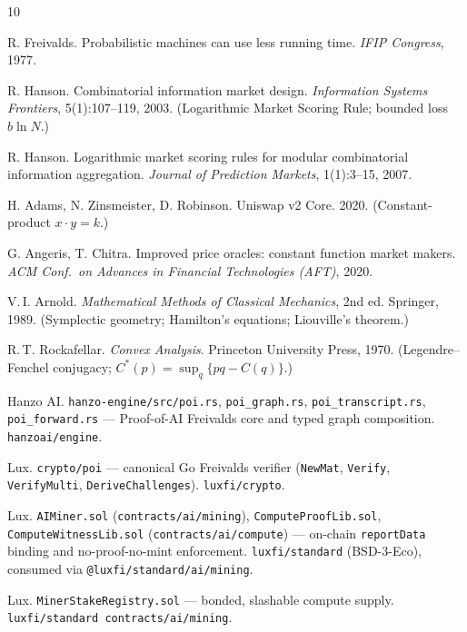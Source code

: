 \documentclass[11pt]{article}
\newcommand{\code}[1]{\texttt{#1}}
\begin{document}
\begin{thebibliography}{10}

R. Freivalds. Probabilistic machines can use less running time.
\textit{IFIP Congress}, 1977.

R. Hanson. Combinatorial information market design.
\textit{Information Systems Frontiers}, 5(1):107--119, 2003.
(Logarithmic Market Scoring Rule; bounded loss $b\ln N$.)

R. Hanson. Logarithmic market scoring rules for modular combinatorial information
aggregation. \textit{Journal of Prediction Markets}, 1(1):3--15, 2007.

H. Adams, N. Zinsmeister, D. Robinson. Uniswap v2 Core. 2020.
(Constant-product $x\cdot y = k$.)

G. Angeris, T. Chitra. Improved price oracles: constant function market makers.
\textit{ACM Conf.\ on Advances in Financial Technologies (AFT)}, 2020.

V.\,I. Arnold. \textit{Mathematical Methods of Classical Mechanics}, 2nd ed.
Springer, 1989. (Symplectic geometry; Hamilton's equations; Liouville's theorem.)

R.\,T. Rockafellar. \textit{Convex Analysis}. Princeton University Press, 1970.
(Legendre--Fenchel conjugacy; $C^{*}(p)=\sup_q\{pq-C(q)\}$.)

Hanzo AI. \code{hanzo-engine/src/poi.rs}, \code{poi\_graph.rs},
\code{poi\_transcript.rs}, \code{poi\_forward.rs} --- Proof-of-AI Freivalds core
and typed graph composition. \texttt{hanzoai/engine}.

Lux. \code{crypto/poi} --- canonical Go Freivalds verifier
(\code{NewMat}, \code{Verify}, \code{VerifyMulti}, \code{DeriveChallenges}).
\texttt{luxfi/crypto}.

Lux. \code{AIMiner.sol} (\code{contracts/ai/mining}),
\code{ComputeProofLib.sol}, \code{ComputeWitnessLib.sol}
(\code{contracts/ai/compute}) --- on-chain \code{reportData} binding and
no-proof-no-mint enforcement. \code{luxfi/standard} (BSD-3-Eco), consumed via
\code{@luxfi/standard/ai/mining}.

Lux. \code{MinerStakeRegistry.sol} --- bonded, slashable compute supply.
\code{luxfi/standard contracts/ai/mining}.


\end{thebibliography}
\end{document}
